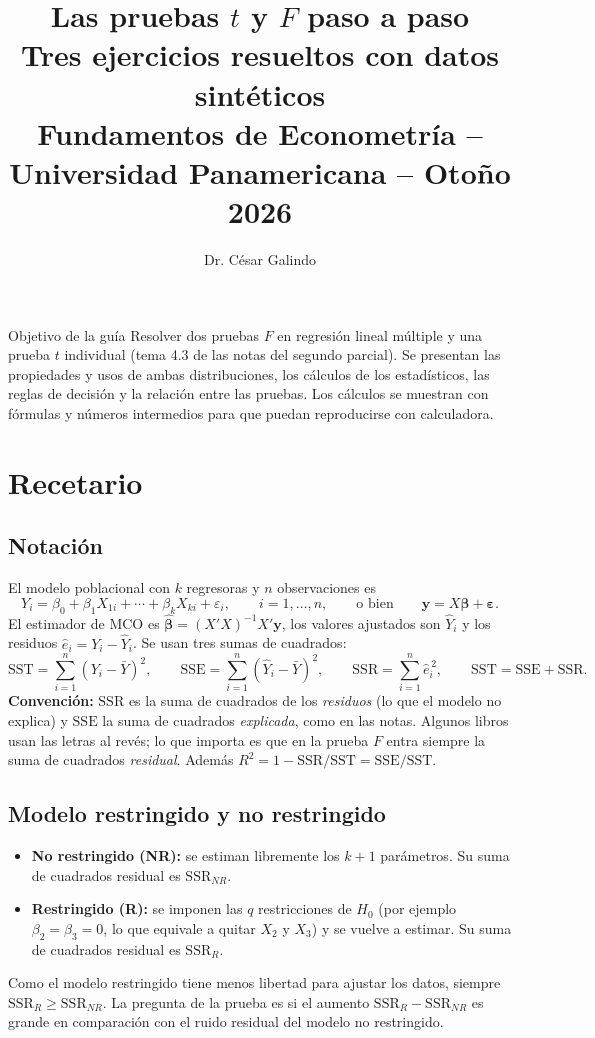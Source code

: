 \documentclass[11pt,letterpaper]{article}
\title{\textbf{Las pruebas $t$ y $F$ paso a paso}\\[4pt]
\large Tres ejercicios resueltos con datos sintéticos\\[2pt]
\normalsize Fundamentos de Econometría -- Universidad Panamericana -- Otoño 2026}
\author{Dr. César Galindo}
\date{}
\newcommand{\SSR}{\mathrm{SSR}}
\newcommand{\SSE}{\mathrm{SSE}}
\newcommand{\SST}{\mathrm{SST}}
\begin{document}
\maketitle

\begin{nota}{Objetivo de la guía}
Resolver dos pruebas $F$ en regresión lineal múltiple y una prueba $t$ individual (tema 4.3 de
las notas del segundo parcial). Se presentan las propiedades y usos de ambas distribuciones, los
cálculos de los estadísticos, las reglas de decisión y la relación entre las pruebas. Los cálculos
se muestran con fórmulas y números intermedios para que puedan reproducirse con calculadora.
\end{nota}

\section{Recetario}

\subsection{Notación}

El modelo poblacional con $k$ regresoras y $n$ observaciones es
\[
Y_i=\beta_0+\beta_1X_{1i}+\cdots+\beta_kX_{ki}+\varepsilon_i,\qquad i=1,\dots,n,
\qquad\text{o bien}\qquad \mathbf y=X\boldsymbol\beta+\boldsymbol\varepsilon .
\]
El estimador de MCO es $\hat{\boldsymbol\beta}=(X'X)^{-1}X'\mathbf y$, los valores ajustados son
$\hat Y_i$ y los residuos $\hat e_i=Y_i-\hat Y_i$. Se usan tres sumas de cuadrados:
\[
\SST=\sum_{i=1}^n (Y_i-\bar Y)^2,\qquad
\SSE=\sum_{i=1}^n (\hat Y_i-\bar Y)^2,\qquad
\SSR=\sum_{i=1}^n \hat e_i^{\,2},\qquad \SST=\SSE+\SSR .
\]
\textbf{Convención:} $\SSR$ es la suma de cuadrados de los \emph{residuos} (lo que el modelo no
explica) y $\SSE$ la suma de cuadrados \emph{explicada}, como en las notas. Algunos libros usan las
letras al revés; lo que importa es que en la prueba $F$ entra siempre la suma de cuadrados
\emph{residual}. Además $R^2=1-\SSR/\SST=\SSE/\SST$.

\subsection{Modelo restringido y no restringido}

\begin{itemize}[leftmargin=1.3em]
\item \textbf{No restringido (NR):} se estiman libremente los $k+1$ parámetros. Su suma de cuadrados
residual es $\SSR_{NR}$.
\item \textbf{Restringido (R):} se imponen las $q$ restricciones de $H_0$ (por ejemplo
$\beta_2=\beta_3=0$, lo que equivale a quitar $X_2$ y $X_3$) y se vuelve a estimar. Su suma de
cuadrados residual es $\SSR_R$.
\end{itemize}
Como el modelo restringido tiene menos libertad para ajustar los datos, siempre
$\SSR_R\ge \SSR_{NR}$. La pregunta de la prueba es si el aumento $\SSR_R-\SSR_{NR}$ es grande en
comparación con el ruido residual del modelo no restringido.
\end{document}

